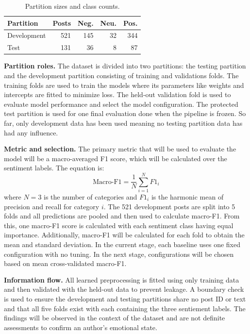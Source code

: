 \documentclass[sigconf,nonacm]{acmart}
\begin{document}
\begin{table}[h]
\caption{Partition sizes and class counts.}
\label{tab:split}
\begin{tabular}{lrrrr}
\toprule
Partition & Posts & Neg. & Neu. & Pos. \\
\midrule
Development & 521 & 145 & 32 & 344 \\
Test & 131 & 36 & 8 & 87 \\
\bottomrule
\end{tabular}
\end{table}

\textbf{Partition roles.}
The dataset is divided into two partitions: the testing partition and the development partition consisting of training and validations folds. The training folds are used to train the models where its parameters like weights and intercepts are fitted to minimize loss. The held-out validation fold is used to evaluate model performance and select the model configuration. The protected test partition is used for one final evaluation done when the pipeline is frozen. So far, only development data has been used meaning no testing partition data has had any influence. 

\textbf{Metric and selection.}
The primary metric that will be used to evaluate the model will be a macro-averaged F1 score, which will be calculated over the sentiment labels. The equation is: \[
\text{Macro-F1} = \frac{1}{N}\sum_{i=1}^{N} F1_i\] where $N=3$ is the number of categories and $F1_i$ is the harmonic mean of precision and recall for category $i$. The 521 development posts are split into 5 folds and all predictions are pooled and then used to calculate macro-F1. From this, one macro-F1 score is calculated with each sentiment class having equal importance. Additionally, macro-F1 will be calculated for each fold to obtain the mean and standard deviation. In the current stage, each baseline uses one fixed configuration with no tuning. In the next stage, configurations will be chosen based on mean cross-validated macro-F1.

\textbf{Information flow.}
All learned preprocessing is fitted using only training data and then validated with the held-out data to prevent leakage. A boundary check is used to ensure the development and testing partitions share no post ID or text and that all five folds exist with each containing the three sentiement labels. The findings will be observed in the context of the dataset and are not definite assessments to confirm an author's emotional state.
\end{document}
